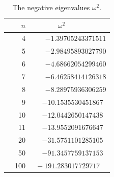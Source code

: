\begin{table}[t]
\caption{The negative eigenvalues $\omega^2$.
\label{table-eigenvals}}
\begin{tabular}{rr}
\hline
$n$ & $\omega^2$~~~~~~~~~~ \\
\hline
4&$-1.39705243371511$\\
5&$-2.98495893027790$\\
6&$-4.68662054299460$\\
7&$-6.46258414126318$\\
8&$-8.28975936306259$\\
9&$-10.1535530451867~\:$\\
10&$-12.0442650147438~\:$\\
11&$-13.9552091676647~\:$\\
20&$-31.5751101285105~\:$\\
50&$-91.3457759137153~\:$\\
~~100&$~~-191.283017729717~~~\:\!$\\
\hline
\end{tabular}
\end{table}


